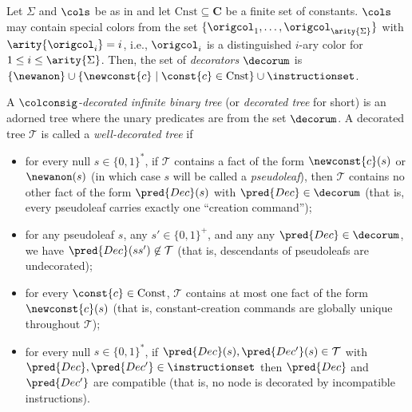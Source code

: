 \begin{definition}\label{def:well-dec}

	Let $\Sigma$ and $\cols$ be as in  and let $\mathrm{Cnst}\subseteq \mathbf{C}$ be a finite set of constants. $\cols$ may contain special colors from the set $\{\origcol_1, \ldots, \origcol_{\arity{\Sigma}}\}$ with $\arity{\origcol_i} = i$, i.e., $\origcol_i$ is a distinguished $i$-ary color for $1\le i\le \arity{\Sigma}$.
Then, the set of \emph{decorators} %
$\decorum$
is
$
\{ \newanon \} \cup \{ \newconst{c} \mid \const{c} \in \mathrm{Cnst}\} \cup \instructionset
$.

	A \emph{$\colconsig$-decorated infinite binary tree} (or \emph{decorated tree} for short) is an adorned tree where the unary predicates are from the set $\decorum$.  A decorated tree $\mathcal{T}$ is called a \emph{well-decorated tree} if 
	\begin{itemize}
		\item for every null $s\in\{ 0,1 \}^*$, if $\mathcal{T}$ contains a fact of the form $\newconst{c}(s)$ or $\newanon(s)$ (in which case $s$ will be called a \emph{pseudoleaf}), then $\mathcal{T}$ contains no other fact of the form $\pred{Dec}(s)$ with $\pred{Dec}\in\decorum$ (that is, every pseudoleaf carries exactly one ``creation command'');
		\item for any pseudoleaf $s$, any $s' \in \{0,1\}^+$, and any any $\pred{Dec}\in\decorum$, we have $\pred{Dec}(ss')\not\in \mathcal{T}$ (that is, descendants of pseudoleafs are undecorated);  
		\item for every $\const{c}\in\mathrm{Const}$, $\mathcal{T}$ contains at most one fact of the form $\newconst{c}(s)$ (that is, constant-creation commands are globally unique throughout $\mathcal{T}$);
        \item for every null $s\in\{ 0,1 \}^*$, if $\pred{Dec}(s),\pred{Dec'}(s) \in \mathcal{T}$ with $\pred{Dec},\pred{Dec'} \in \instructionset$ then $\pred{Dec}$ and $\pred{Dec'}$ are compatible (that is,  
        no node is decorated by incompatible instructions).
	\end{itemize}
\end{definition}



